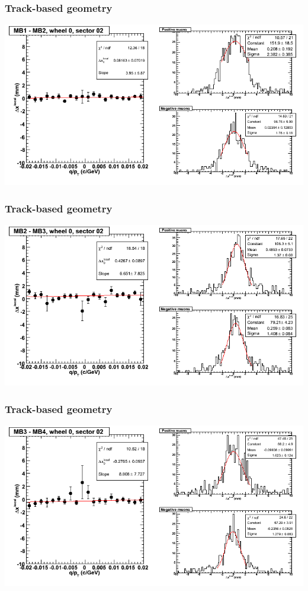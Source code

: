 \documentclass[compress]{beamer}
\begin{document}
\begin{frame}
\frametitle{Track-based geometry}
\includegraphics[width=\linewidth]{NOV4_segdiffs/dt13_resid_C_02_12.png}
\end{frame}

\begin{frame}
\frametitle{Track-based geometry}
\includegraphics[width=\linewidth]{NOV4_segdiffs/dt13_resid_C_02_23.png}
\end{frame}

\begin{frame}
\frametitle{Track-based geometry}
\includegraphics[width=\linewidth]{NOV4_segdiffs/dt13_resid_C_02_34.png}
\end{frame}
\end{document}
